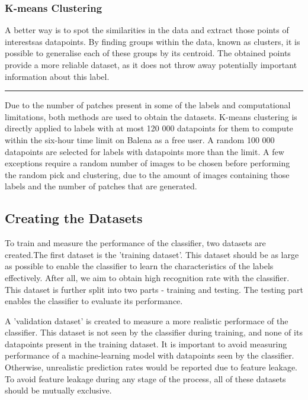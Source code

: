 \documentclass[dissertation.tex]{subfiles}
\begin{document}
\subsubsection{K-means Clustering}
A better way is to spot the similarities in the data and extract those points of interestsas datapoints. By finding groups within the data, known as clusters, it is possible to generalise each of these groups by its centroid. The obtained points provide a more reliable dataset, as it does not throw away potentially important information about this label.


\rule{200pt}{1pt}

Due to the number of patches present in some of the labels and computational limitations, both methods are used to obtain the datasets. K-means clustering is directly applied to labels with at most 120 000 datapoints for them to compute within the six-hour time limit on Balena as a free user. A random 100 000 datapoints are selected for labels with datapoints more than the limit. A few exceptions require a random number of images to be chosen before performing the random pick and clustering, due to the amount of images containing those labels and the number of patches that are generated. 

\subsection{Creating the Datasets}
To train and measure the performance of the classifier, two datasets are created.The first dataset is the 'training dataset'. This dataset should be as large as possible to enable the classifier to learn the characteristics of the labels effectively. After all, we aim to obtain high recognition rate with the classifier. This dataset is further split into two parts - training and testing. The testing part enables the classifier to evaluate its performance.

A 'validation dataset' is created to measure a more realistic performace of the classifier. This dataset is not seen by the classifier during training, and none of its datapoints present in the training dataset. It is important to avoid measuring performance of a machine-learning model with datapoints seen by the classifier. Otherwise, unrealistic prediction rates would be reported due to feature leakage. To avoid feature leakage during any stage of the process, all of these datasets should be mutually exclusive.
\end{document}
